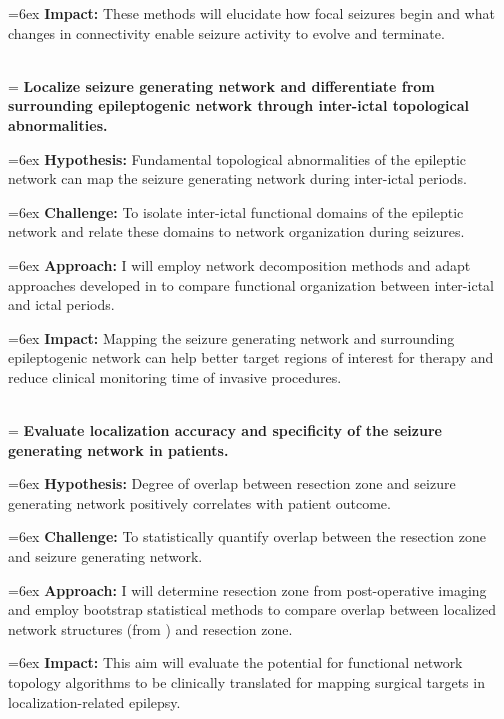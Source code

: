 \hangindent=6ex
\textbf{Impact:} These methods will elucidate how focal seizures begin and what changes in connectivity enable seizure activity to evolve and terminate.

~\\
\hangindent=\parindent
{}
\noindent
{} \textbf{Localize seizure generating network and differentiate from surrounding epileptogenic network through inter-ictal topological abnormalities.}

\hangindent=6ex
\textbf{Hypothesis:} Fundamental topological abnormalities of the epileptic network can map the seizure generating network during inter-ictal periods.

\hangindent=6ex
\textbf{Challenge:} To isolate inter-ictal functional domains of the epileptic network and relate these domains to network organization during seizures.

\hangindent=6ex
\textbf{Approach:} I will employ network decomposition methods and adapt approaches developed in  to compare functional organization between inter-ictal and ictal periods.

\hangindent=6ex
\textbf{Impact:} Mapping the seizure generating network and surrounding epileptogenic network can help better target regions of interest for therapy and reduce clinical monitoring time of invasive procedures.

~\\
\hangindent=\parindent
{}
\noindent
{} \textbf{Evaluate localization accuracy and specificity of the seizure generating network in patients.}

\hangindent=6ex
\textbf{Hypothesis:} Degree of overlap between resection zone and seizure generating network positively correlates with patient outcome.

\hangindent=6ex
\textbf{Challenge:} To statistically quantify overlap between the resection zone and seizure generating network.

\hangindent=6ex
\textbf{Approach:} I will determine resection zone from post-operative imaging and employ bootstrap statistical methods to compare overlap between localized network structures (from ) and resection zone.

\hangindent=6ex
\textbf{Impact:} This aim will evaluate the potential for functional network topology algorithms to be clinically translated for mapping surgical targets in localization-related epilepsy.
